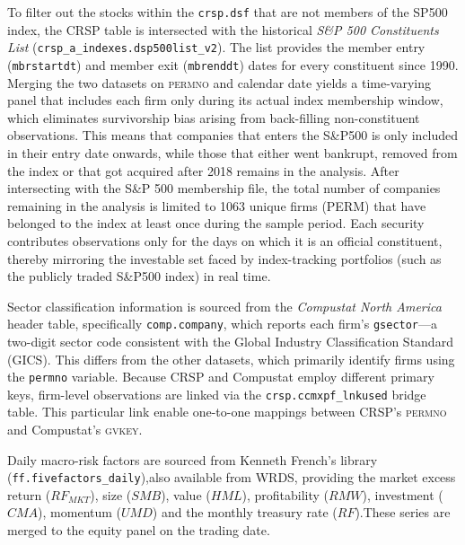 To filter out the stocks within the \texttt{crsp.dsf} that are not members of the SP500 index, the CRSP table is intersected with the historical \emph{S\&P 500 Constituents List} (\texttt{crsp\_a\_indexes.dsp500list\_v2}). The list provides the member entry (\texttt{mbrstartdt}) and member exit (\texttt{mbrenddt}) dates for every constituent since 1990. Merging the two datasets on \textsc{permno} and calendar date yields a time-varying panel that includes each firm only during its actual index membership window, which eliminates survivorship bias arising from back-filling non-constituent observations. This means that companies that enters the S\&P500 is only included in their entry date onwards, while those that either went bankrupt, removed from the index or that got acquired after 2018 remains in the analysis. After intersecting with the S\&P 500 membership file, the total number of companies remaining in the analysis is limited to 1063 unique firms (PERM) that have belonged to the index at least once during the sample period. Each security contributes observations only for the days on which it is an official constituent, thereby mirroring the investable set faced by index-tracking portfolios (such as the publicly traded S\&P500 index) in real time.

Sector classification information is sourced from the \emph{Compustat North America} header table, specifically \texttt{comp.company}, which reports each firm's \texttt{gsector}—a two-digit sector code consistent with the Global Industry Classification Standard (GICS). This differs from the other datasets, which primarily identify firms using the \texttt{permno} variable. Because CRSP and Compustat employ different primary keys, firm-level observations are linked via the \texttt{crsp.ccmxpf\_lnkused} bridge table. This particular link enable one-to-one mappings between CRSP's \textsc{permno} and Compustat's \textsc{gvkey}.

Daily macro-risk factors are sourced from Kenneth French's library (\texttt{ff.fivefactors\_daily}),also available from WRDS, providing the market excess return ($RF_{MKT}$), size ($SMB$), value ($HML$), profitability ($RMW$), investment ($CMA$), momentum ($UMD$) and the monthly treasury rate ($RF$).These series are merged to the equity panel on the trading date.

